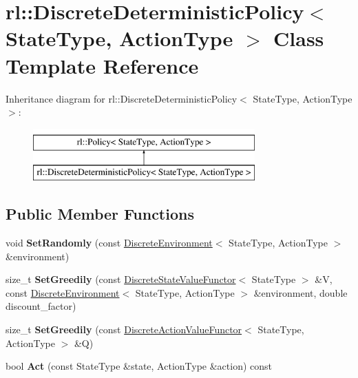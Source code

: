 \hypertarget{classrl_1_1_discrete_deterministic_policy}{}\section{rl\+:\+:Discrete\+Deterministic\+Policy$<$ State\+Type, Action\+Type $>$ Class Template Reference}
\label{classrl_1_1_discrete_deterministic_policy}
Inheritance diagram for rl\+:\+:Discrete\+Deterministic\+Policy$<$ State\+Type, Action\+Type $>$\+:\begin{figure}[H]
\begin{center}
\leavevmode
\includegraphics[height=2.000000cm]{classrl_1_1_discrete_deterministic_policy}
\end{center}
\end{figure}
\subsection*{Public Member Functions}
\begin{DoxyCompactItemize}
\item 
\hypertarget{classrl_1_1_discrete_deterministic_policy_aa0502bdff3bbe4896d52b50e6fb682f3}{}\label{classrl_1_1_discrete_deterministic_policy_aa0502bdff3bbe4896d52b50e6fb682f3} 
void {\bfseries Set\+Randomly} (const \hyperlink{classrl_1_1_discrete_environment}{Discrete\+Environment}$<$ State\+Type, Action\+Type $>$ \&environment)
\item 
\hypertarget{classrl_1_1_discrete_deterministic_policy_a9391924c1b0ad563aff49dedc80af744}{}\label{classrl_1_1_discrete_deterministic_policy_a9391924c1b0ad563aff49dedc80af744} 
size\+\_\+t {\bfseries Set\+Greedily} (const \hyperlink{structrl_1_1_discrete_state_value_functor}{Discrete\+State\+Value\+Functor}$<$ State\+Type $>$ \&V, const \hyperlink{classrl_1_1_discrete_environment}{Discrete\+Environment}$<$ State\+Type, Action\+Type $>$ \&environment, double discount\+\_\+factor)
\item 
\hypertarget{classrl_1_1_discrete_deterministic_policy_a378029387659936c201d6e7e50d10201}{}\label{classrl_1_1_discrete_deterministic_policy_a378029387659936c201d6e7e50d10201} 
size\+\_\+t {\bfseries Set\+Greedily} (const \hyperlink{structrl_1_1_discrete_action_value_functor}{Discrete\+Action\+Value\+Functor}$<$ State\+Type, Action\+Type $>$ \&Q)
\item 
\hypertarget{classrl_1_1_discrete_deterministic_policy_aa464571566c0a6f97bb7e415fb78a491}{}\label{classrl_1_1_discrete_deterministic_policy_aa464571566c0a6f97bb7e415fb78a491} 
bool {\bfseries Act} (const State\+Type \&state, Action\+Type \&action) const
\end{DoxyCompactItemize}


